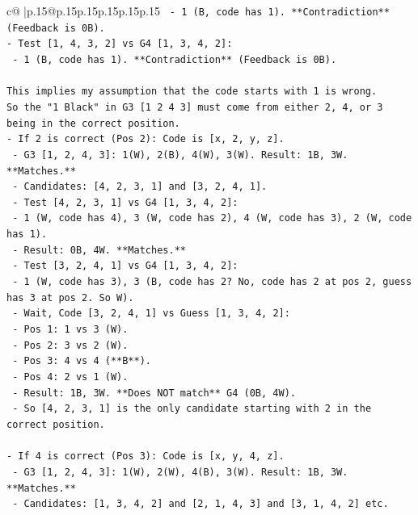 \documentclass{article}
\begin{document}
{\begin{supertabular}{c@{$\;$}|p{.15\linewidth}@{}p{.15\linewidth}p{.15\linewidth}p{.15\linewidth}p{.15\linewidth}p{.15\linewidth}}
{{{\texttt{  {-} 1 (B, code has 1). **Contradiction** (Feedback is 0B).} \\
\texttt{{-} Test {[}1, 4, 3, 2{]} vs G4 {[}1, 3, 4, 2{]}:} \\
\texttt{  {-} 1 (B, code has 1). **Contradiction** (Feedback is 0B).} \\
\\ 
\texttt{This implies my assumption that the code starts with 1 is wrong.} \\
\texttt{So the "1 Black" in G3 {[}1 2 4 3{]} must come from either 2, 4, or 3 being in the correct position.} \\
\texttt{{-} If 2 is correct (Pos 2): Code is {[}x, 2, y, z{]}.} \\
\texttt{  {-} G3 {[}1, 2, 4, 3{]}: 1(W), 2(B), 4(W), 3(W). Result: 1B, 3W. **Matches.**} \\
\texttt{  {-} Candidates: {[}4, 2, 3, 1{]} and {[}3, 2, 4, 1{]}.} \\
\texttt{  {-} Test {[}4, 2, 3, 1{]} vs G4 {[}1, 3, 4, 2{]}:} \\
\texttt{    {-} 1 (W, code has 4), 3 (W, code has 2), 4 (W, code has 3), 2 (W, code has 1).} \\
\texttt{    {-} Result: 0B, 4W. **Matches.**} \\
\texttt{  {-} Test {[}3, 2, 4, 1{]} vs G4 {[}1, 3, 4, 2{]}:} \\
\texttt{    {-} 1 (W, code has 3), 3 (B, code has 2? No, code has 2 at pos 2, guess has 3 at pos 2. So W).} \\
\texttt{    {-} Wait, Code {[}3, 2, 4, 1{]} vs Guess {[}1, 3, 4, 2{]}:} \\
\texttt{      {-} Pos 1: 1 vs 3 (W).} \\
\texttt{      {-} Pos 2: 3 vs 2 (W).} \\
\texttt{      {-} Pos 3: 4 vs 4 (**B**).} \\
\texttt{      {-} Pos 4: 2 vs 1 (W).} \\
\texttt{      {-} Result: 1B, 3W. **Does NOT match** G4 (0B, 4W).} \\
\texttt{  {-} So {[}4, 2, 3, 1{]} is the only candidate starting with 2 in the correct position.} \\
\\ 
\texttt{{-} If 4 is correct (Pos 3): Code is {[}x, y, 4, z{]}.} \\
\texttt{  {-} G3 {[}1, 2, 4, 3{]}: 1(W), 2(W), 4(B), 3(W). Result: 1B, 3W. **Matches.**} \\
\texttt{  {-} Candidates: {[}1, 3, 4, 2{]} and {[}2, 1, 4, 3{]} and {[}3, 1, 4, 2{]} etc.} \\
}}}
\end{supertabular}}
\end{document}
